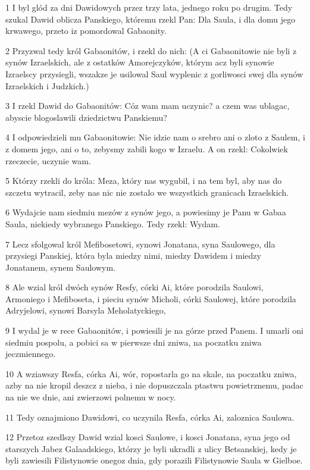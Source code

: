 \par 1 I byl glód za dni Dawidowych przez trzy lata, jednego roku po drugim. Tedy szukal Dawid oblicza Panskiego, któremu rzekl Pan: Dla Saula, i dla domu jego krwawego, przeto iz pomordowal Gabaonity.
\par 2 Przyzwal tedy król Gabaonitów, i rzekl do nich: (A ci Gabaonitowie nie byli z synów Izraelskich, ale z ostatków Amorejczyków, którym acz byli synowie Izraelscy przysiegli, wszakze je usilowal Saul wyplenic z gorliwosci swej dla synów Izraelskich i Judzkich.)
\par 3 I rzekl Dawid do Gabaonitów: Cóz wam mam uczynic? a czem was ublagac, abyscie blogoslawili dziedzictwu Panskiemu?
\par 4 I odpowiedzieli mu Gabaonitowie: Nie idzie nam o srebro ani o zloto z Saulem, i z domem jego, ani o to, zebysmy zabili kogo w Izraelu. A on rzekl: Cokolwiek rzeczecie, uczynie wam.
\par 5 Którzy rzekli do króla: Meza, który nas wygubil, i na tem byl, aby nas do szczetu wytracil, zeby nas nic nie zostalo we wszystkich granicach Izraelskich.
\par 6 Wydajcie nam siedmiu mezów z synów jego, a powiesimy je Panu w Gabaa Saula, niekiedy wybranego Panskiego. Tedy rzekl: Wydam.
\par 7 Lecz sfolgowal król Mefibosetowi, synowi Jonatana, syna Saulowego, dla przysiegi Panskiej, która byla miedzy nimi, miedzy Dawidem i miedzy Jonatanem, synem Saulowym.
\par 8 Ale wzial król dwóch synów Resfy, córki Ai, które porodzila Saulowi, Armoniego i Mefiboseta, i pieciu synów Micholi, córki Saulowej, które porodzila Adryjelowi, synowi Barsyla Meholatyckiego,
\par 9 I wydal je w rece Gabaonitów, i powiesili je na górze przed Panem. I umarli oni siedmiu pospolu, a pobici sa w pierwsze dni zniwa, na poczatku zniwa jeczmiennego.
\par 10 A wziawszy Resfa, córka Ai, wór, ropostarla go na skale, na poczatku zniwa, azby na nie kropil deszcz z nieba, i nie dopuszczala ptastwu powietrznemu, padac na nie we dnie, ani zwierzowi polnemu w nocy.
\par 11 Tedy oznajmiono Dawidowi, co uczynila Resfa, córka Ai, zaloznica Saulowa.
\par 12 Przetoz szedlszy Dawid wzial kosci Saulowe, i kosci Jonatana, syna jego od starszych Jabez Galaadskiego, którzy je byli ukradli z ulicy Betsanskiej, kedy je byli zawiesili Filistynowie onegoz dnia, gdy porazili Filistynowie Saula w Gielboe.
